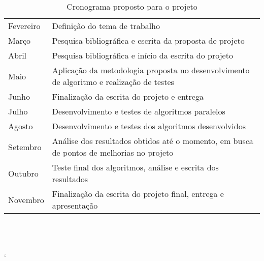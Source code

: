 \begin{table}
\begin{center}
\renewcommand{\arraystretch}{1.5}
\setlength\tabcolsep{7pt}

\begin{tabular}{|p{2cm} p{11.5cm}|}
\hline
Fevereiro & Definição do tema de trabalho\\ 
Março & Pesquisa bibliográfica e escrita da proposta de projeto\\
Abril & Pesquisa bibliográfica e início da escrita do projeto\\
Maio & Aplicação da metodologia proposta no desenvolvimento de algoritmo e realização de testes \\
Junho & Finalização da escrita do projeto e entrega \\
Julho & Desenvolvimento e testes de algoritmos paralelos\\
Agosto & Desenvolvimento e testes dos algoritmos desenvolvidos \\
Setembro & Análise dos resultados obtidos até o momento, em busca de pontos de melhorias no projeto \\
Outubro & Teste final dos algoritmos, análise e escrita dos resultados \\
Novembro & Finalização da escrita do projeto final, entrega e apresentação \\
\hline
\end{tabular}

\caption{Cronograma proposto para o projeto}
\end{center}
\label{tab:valores}
\end{table}


\cite{Kale:2010} \\
\cite{Manferdelli:2008} \\
\cite{Dean:2008} \\
\cite{Asanovic:2009}`